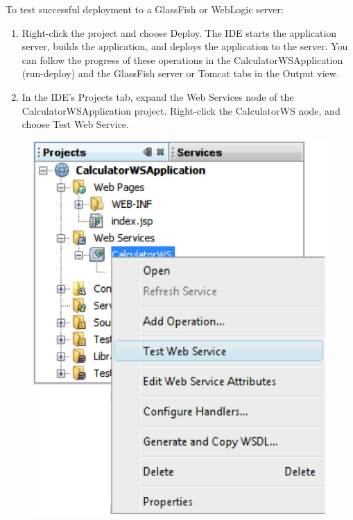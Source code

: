 To test successful deployment to a GlassFish or WebLogic server:
\begin{enumerate}
\item Right-click the project and choose Deploy. The IDE starts the application server, builds the application, and deploys the application to the server. You can follow the progress of these operations in the CalculatorWSApplication (run-deploy) and the GlassFish server or Tomcat tabs in the Output view.
\item In the IDE's Projects tab, expand the Web Services node of the CalculatorWSApplication project. Right-click the CalculatorWS node, and choose Test Web Service.
\end{enumerate}

\begin{figure}
\begin{center}
\includegraphics[scale=1]{J8}
\label{J8}
\end{center}
\end{figure}

